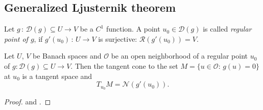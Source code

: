 \documentclass[../skript.tex]{subfiles}
\begin{document}
\subsection{Generalized Ljusternik theorem}

\begin{definition}\label{definition_1.30}
	Let $g\,:\,\mathcal{D}(g)\subseteq U\to V$ be a $C^1$ function. A point $u_0\in\mathcal{D}(g)$ is called \emph{regular point of $g$}, if $g'(u_0)\,:\,U\to V$ is surjective: $\mathcal{R}(g'(u_0)) = V$.
\end{definition}

\begin{theorem}\label{theorem_1.31}
	Let $U$, $V$ be Banach spaces and $\mathcal{O}$ be an open neighborhood of a regular point $u_0$ of $g:\mathcal{D}(g)\subseteq U\to V$. Then the tangent cone to the set $M = \{u\in\mathcal{O}:\,g(u) = 0\}$ at $u_0$ is a tangent space and
	\[
		T_{u_0}M = \mathcal{N}(g'(u_0)).
	\]
\end{theorem}
\begin{proof}
	\cite[Chapter 0.2.4]{Ioffe} and 
	\cite[Chapter 8, § 10]{Ljusternik}.
\end{proof}
\end{document}
